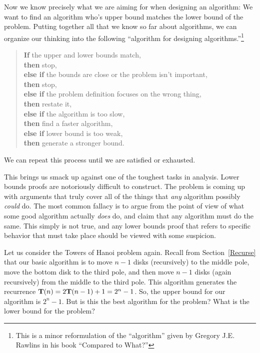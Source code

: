 Now we know precisely what we are aiming for when designing an
algorithm:
We want to find an algorithm who's upper bound matches the lower bound
of the problem.
Putting together all that we know so far about algorithms, we can
organize our thinking into the following ``algorithm for designing
algorithms.''\footnote{This is a minor reformulation of the
``algorithm'' given by Gregory J.E. Rawlins in his book
``Compared to What?''}

\begin{verse}
\textbf{If} the upper and lower bounds match,\\
\textbf{then} stop,\\
\textbf{else if} the bounds are close or the problem isn't important,\\
\quad \textbf{then} stop,\\
\quad \textbf{else if} the problem definition focuses on the wrong thing,\\
\qquad \textbf{then} restate it,\\
\qquad \textbf{else if} the algorithm is too slow,\\
\qquad\quad \textbf{then} find a faster algorithm,\\
\qquad\quad \textbf{else if} lower bound is too weak,\\
\qquad\qquad \textbf{then} generate a stronger bound.
\end{verse}

\noindent We can repeat this process until we are satisfied or
exhausted.

This brings us smack up against one of the toughest tasks in
analysis.
Lower bounds proofs are notoriously difficult to construct.
The problem is coming up with arguments that truly cover all of the
things that \emph{any} algorithm possibly \emph{could} do.
The most common fallacy is to argue from the point of view of what
some good algorithm actually \emph{does} do, and claim that any
algorithm must do the same.
This simply is not true, and any lower bounds proof that refers to
specific behavior that must take place should be viewed with some
suspicion.

Let us consider the Towers of Hanoi problem again.
Recall from Section~\ref{Recurse} that our basic algorithm is to move
\(n-1\) disks (recursively) to the middle pole, move the bottom disk
to the third pole, and then move \(n-1\) disks (again recursively)
from the middle to the third pole.
This algorithm generates the recurrence
\({\bf T}(n) = 2{\bf T}(n-1) + 1 = 2^n - 1\).
So, the upper bound for our algorithm is \(2^n -1\).
But is this the best algorithm for the problem?
What is the lower bound for the problem?


